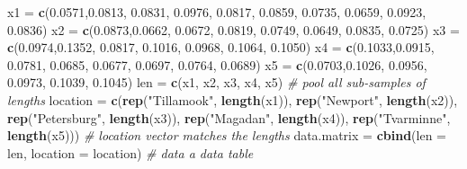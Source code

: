 \documentclass[
]{book}
\newenvironment{Shaded}{\begin{snugshade}}{\end{snugshade}}
\newcommand{\AttributeTok}[1]{\textcolor[rgb]{0.13,0.29,0.53}{#1}}
\newcommand{\CommentTok}[1]{\textcolor[rgb]{0.56,0.35,0.01}{\textit{#1}}}
\newcommand{\FloatTok}[1]{\textcolor[rgb]{0.00,0.00,0.81}{#1}}
\newcommand{\FunctionTok}[1]{\textcolor[rgb]{0.13,0.29,0.53}{\textbf{#1}}}
\newcommand{\NormalTok}[1]{#1}
\newcommand{\OtherTok}[1]{\textcolor[rgb]{0.56,0.35,0.01}{#1}}
\newcommand{\StringTok}[1]{\textcolor[rgb]{0.31,0.60,0.02}{#1}}
\begin{document}
\begin{Shaded}
\begin{Highlighting}[]
\NormalTok{x1 }\OtherTok{=} \FunctionTok{c}\NormalTok{(}\FloatTok{0.0571}\NormalTok{,}\FloatTok{0.0813}\NormalTok{, }\FloatTok{0.0831}\NormalTok{, }\FloatTok{0.0976}\NormalTok{, }\FloatTok{0.0817}\NormalTok{, }\FloatTok{0.0859}\NormalTok{, }\FloatTok{0.0735}\NormalTok{, }\FloatTok{0.0659}\NormalTok{, }\FloatTok{0.0923}\NormalTok{, }\FloatTok{0.0836}\NormalTok{) }
\NormalTok{x2 }\OtherTok{=} \FunctionTok{c}\NormalTok{(}\FloatTok{0.0873}\NormalTok{,}\FloatTok{0.0662}\NormalTok{, }\FloatTok{0.0672}\NormalTok{, }\FloatTok{0.0819}\NormalTok{, }\FloatTok{0.0749}\NormalTok{, }\FloatTok{0.0649}\NormalTok{, }\FloatTok{0.0835}\NormalTok{, }\FloatTok{0.0725}\NormalTok{)}
\NormalTok{x3 }\OtherTok{=} \FunctionTok{c}\NormalTok{(}\FloatTok{0.0974}\NormalTok{,}\FloatTok{0.1352}\NormalTok{, }\FloatTok{0.0817}\NormalTok{, }\FloatTok{0.1016}\NormalTok{, }\FloatTok{0.0968}\NormalTok{, }\FloatTok{0.1064}\NormalTok{, }\FloatTok{0.1050}\NormalTok{)}
\NormalTok{x4 }\OtherTok{=} \FunctionTok{c}\NormalTok{(}\FloatTok{0.1033}\NormalTok{,}\FloatTok{0.0915}\NormalTok{, }\FloatTok{0.0781}\NormalTok{, }\FloatTok{0.0685}\NormalTok{, }\FloatTok{0.0677}\NormalTok{, }\FloatTok{0.0697}\NormalTok{, }\FloatTok{0.0764}\NormalTok{, }\FloatTok{0.0689}\NormalTok{)}
\NormalTok{x5 }\OtherTok{=} \FunctionTok{c}\NormalTok{(}\FloatTok{0.0703}\NormalTok{,}\FloatTok{0.1026}\NormalTok{, }\FloatTok{0.0956}\NormalTok{, }\FloatTok{0.0973}\NormalTok{, }\FloatTok{0.1039}\NormalTok{, }\FloatTok{0.1045}\NormalTok{)}
\NormalTok{len  }\OtherTok{=} \FunctionTok{c}\NormalTok{(x1, x2, x3, x4, x5)      }\CommentTok{\# pool all sub{-}samples of lengths}
\NormalTok{location }\OtherTok{=} \FunctionTok{c}\NormalTok{(}\FunctionTok{rep}\NormalTok{(}\StringTok{"Tillamook"}\NormalTok{, }\FunctionTok{length}\NormalTok{(x1)), }
             \FunctionTok{rep}\NormalTok{(}\StringTok{"Newport"}\NormalTok{, }\FunctionTok{length}\NormalTok{(x2)),}
             \FunctionTok{rep}\NormalTok{(}\StringTok{"Petersburg"}\NormalTok{, }\FunctionTok{length}\NormalTok{(x3)),}
             \FunctionTok{rep}\NormalTok{(}\StringTok{"Magadan"}\NormalTok{, }\FunctionTok{length}\NormalTok{(x4)),}
             \FunctionTok{rep}\NormalTok{(}\StringTok{"Tvarminne"}\NormalTok{, }\FunctionTok{length}\NormalTok{(x5)))     }\CommentTok{\# location vector matches the lengths}
\NormalTok{data.matrix }\OtherTok{=} \FunctionTok{cbind}\NormalTok{(}\AttributeTok{len =}\NormalTok{  len, }\AttributeTok{location =}\NormalTok{ location)   }\CommentTok{\# data a data table}

\end{Highlighting}
\end{Shaded}
\end{document}
